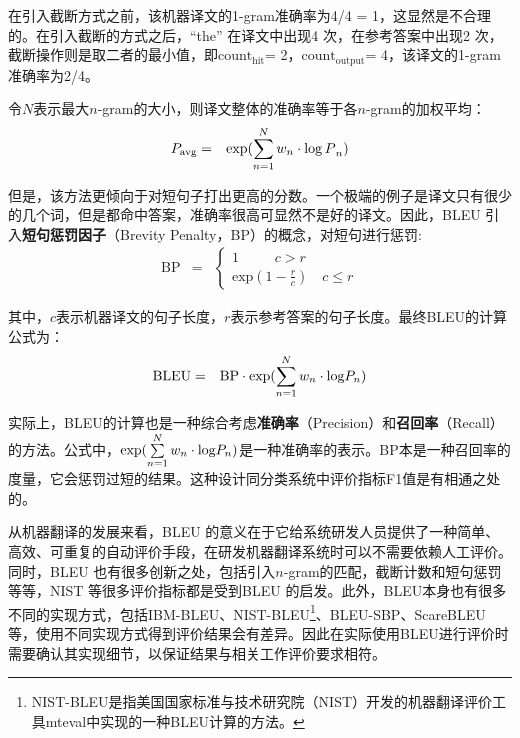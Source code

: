 \parinterval 在引入截断方式之前，该机器译文的1-gram准确率为4/4 = 1，这显然是不合理的。在引入截断的方式之后，“the” 在译文中出现4 次，在参考答案中出现2 次，截断操作则是取二者的最小值，即$\textrm{count}_{\textrm{hit}}$= 2，$\textrm{count}_{\textrm{output}}$= 4，该译文的1-gram准确率为2/4。

\parinterval 令$N$表示最大$n$-gram的大小，则译文整体的准确率等于各$n$-gram的加权平均：
\begin{eqnarray}
{{P}_{{\textrm{avg}}}} &=& \exp (\sum\limits_{n = 1}^N {{w_n} \cdot {{{\mathop{\log{P}}\nolimits} }_n}} )
\label{eq:4-5}
\end{eqnarray}

\parinterval 但是，该方法更倾向于对短句子打出更高的分数。一个极端的例子是译文只有很少的几个词，但是都命中答案，准确率很高可显然不是好的译文。因此，BLEU 引入{\small\sffamily\bfseries{短句惩罚因子}}（Brevity Penalty，BP）的概念，对短句进行惩罚:
\begin{eqnarray}
\textrm {BP} &=& \left\{ \begin{array}{l}
1\quad \quad \;\;c > r\\
{\textrm{exp}}(1 - \frac{r}{c})\quad c \le r
\end{array} \right.
\label{eq:4-6}
\end{eqnarray}

\noindent 其中，$c$表示机器译文的句子长度，$r$表示参考答案的句子长度。最终BLEU的计算公式为：
\begin{eqnarray}
\textrm {BLEU} &=& \textrm {BP} \cdot \exp(\sum\limits_{n = 1}^N {{w_n} \cdot {{{\mathop{\textrm {log}}\nolimits} }{P}_n}} )
\label{eq:4-7}
\end{eqnarray}

\parinterval 实际上，BLEU的计算也是一种综合考虑{\small\sffamily\bfseries{准确率}}（Precision）和{\small\sffamily\bfseries{召回率}}（Recall）的方法。公式中，$\exp(\sum\limits_{n = 1}^N {{w_n} \cdot {{{\mathop{\textrm {log}}\nolimits} }{P}_n}} )$是一种准确率的表示。BP本是一种召回率的度量，它会惩罚过短的结果。这种设计同分类系统中评价指标F1值是有相通之处的。

\parinterval 从机器翻译的发展来看，BLEU 的意义在于它给系统研发人员提供了一种简单、高效、可重复的自动评价手段，在研发机器翻译系统时可以不需要依赖人工评价。同时，BLEU 也有很多创新之处，包括引入$n$-gram的匹配，截断计数和短句惩罚等等，NIST 等很多评价指标都是受到BLEU 的启发。此外，BLEU本身也有很多不同的实现方式，包括IBM-BLEU、NIST-BLEU\footnote{NIST-BLEU是指美国国家标准与技术研究院（NIST）开发的机器翻译评价工具mteval中实现的一种BLEU计算的方法。}、BLEU-SBP、ScareBLEU等，使用不同实现方式得到评价结果会有差异。因此在实际使用BLEU进行评价时需要确认其实现细节，以保证结果与相关工作评价要求相符。

